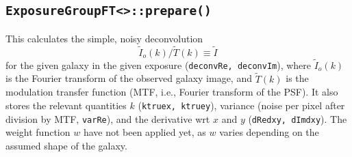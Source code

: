 \documentclass[useAMS,usenatbib,usegraphicx]{mn2e}
\begin{document}
\subsection{\texttt{ExposureGroupFT<>::prepare()}}
This calculates the simple, noisy deconvolution
\begin{equation}
\tilde{I}_o(k) / \tilde{T}(k) \equiv \tilde{I} 
\end{equation}
for the given galaxy in the given exposure ({\tt deconvRe, deconvIm}),
where $\tilde{I}_o(k)$ is the Fourier transform of the observed galaxy image, and 
$\tilde{T}(k)$ is the modulation transfer function (MTF, i.e., Fourier transform of the PSF).
It also stores the relevant quantities $k$ ({\tt ktruex, ktruey}), variance (noise per pixel 
after division by MTF, {\tt varRe}), and the derivative wrt $x$ and $y$ ({\tt dRedxy, dImdxy}).
The weight function $w$ have not been applied yet, as $w$ varies depending on the assumed shape
of the galaxy.
\end{document}
